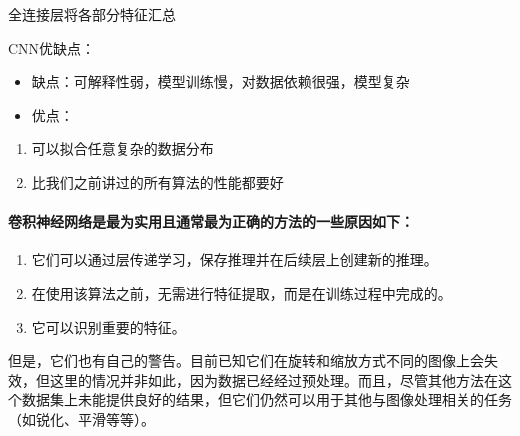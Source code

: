 \documentclass[letterpaper,11pt,english]{sphinxmanual}
\begin{document}
全连接层将各部分特征汇总%
\begin{footnote}[849]\sphinxAtStartFootnote
{}
%
\end{footnote}

CNN优缺点：
\begin{itemize}
\item {} 
缺点：可解释性弱，模型训练慢，对数据依赖很强，模型复杂

\item {} 
优点：

\end{itemize}
\begin{enumerate}
%
\item {} 
可以拟合任意复杂的数据分布

\item {} 
比我们之前讲过的所有算法的性能都要好

\end{enumerate}


\paragraph{卷积神经网络是最为实用且通常最为正确的方法的一些原因如下：}
\label{\detokenize{chapter_AI_dive/DL:id3}}\begin{enumerate}
%
\item {} 
它们可以通过层传递学习，保存推理并在后续层上创建新的推理。

\item {} 
在使用该算法之前，无需进行特征提取，而是在训练过程中完成的。

\item {} 
它可以识别重要的特征。

\end{enumerate}

但是，它们也有自己的警告。目前已知它们在旋转和缩放方式不同的图像上会失效，但这里的情况并非如此，因为数据已经经过预处理。而且，尽管其他方法在这个数据集上未能提供良好的结果，但它们仍然可以用于其他与图像处理相关的任务（如锐化、平滑等等）。%
\begin{footnote}[850]\sphinxAtStartFootnote
{}
%
\end{footnote}
\end{document}
